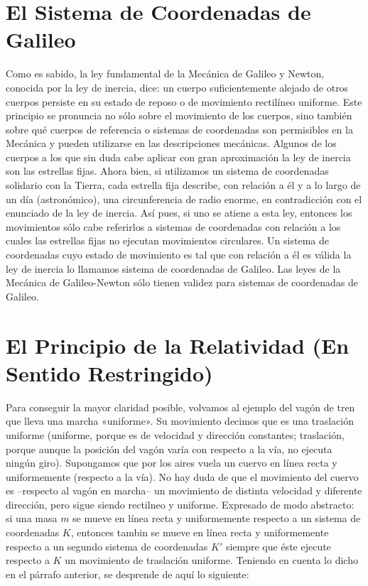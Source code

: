 \documentclass[spanish]{book}
\begin{document}
\chapter{El Sistema de Coordenadas de Galileo}

Como es sabido, la ley fundamental de la Mecánica de Galileo y Newton, conocida
por la ley de inercia, dice: un cuerpo suficientemente alejado de otros cuerpos
persiste en su estado de reposo o de movimiento rectilíneo uniforme. Este principio
se pronuncia no sólo sobre el movimiento de los cuerpos, sino también sobre qué
cuerpos de referencia o sistemas de coordenadas son permisibles en la Mecánica y
pueden utilizarse en las descripciones mecánicas. Algunos de los cuerpos a los que sin
duda cabe aplicar con gran aproximación la ley de inercia son las estrellas fijas. Ahora
bien, si utilizamos un sistema de coordenadas solidario con la Tierra, cada estrella fija
describe, con relación a él y a lo largo de un día (astronómico), una circunferencia de
radio enorme, en contradicción con el enunciado de la ley de inercia. Así pues, si uno
se atiene a esta ley, entonces los movimientos sólo cabe referirlos a sistemas de
coordenadas con relación a los cuales las estrellas fijas no ejecutan movimientos
circulares. Un sistema de coordenadas cuyo estado de movimiento es tal que con
relación a él es válida la ley de inercia lo llamamos sistema de coordenadas de
Galileo. Las leyes de la Mecánica de Galileo-Newton sólo tienen validez para
sistemas de coordenadas de Galileo.

\chapter{El Principio de la Relatividad (En Sentido Restringido)}

Para conseguir la mayor claridad posible, volvamos al ejemplo del vagón de tren que
lleva una marcha «uniforme». Su movimiento decimos que es una traslación uniforme
(uniforme, porque es de velocidad y dirección constantes; traslación, porque
aunque la posición del vagón varía con respecto a la vía, no ejecuta ningún giro).
Supongamos que por los aires vuela un cuervo en línea recta y uniformemente
(respecto a la vía). No hay duda de que el movimiento del cuervo es --respecto al
vagón en marcha-- un movimiento de distinta velocidad y diferente dirección, pero
sigue siendo rectilneo y uniforme. Expresado de modo abstracto: si una masa $m$ se
mueve en línea recta y uniformemente respecto a un sistema de coordenadas $K$,
entonces tambin se mueve en línea recta y uniformemente respecto a un segundo
sistema de coordenadas $K'$ siempre que éste ejecute respecto a $K$ un movimiento de
traslación uniforme. Teniendo en cuenta lo dicho en el párrafo anterior, se desprende
de aquí lo siguiente:
\end{document}
